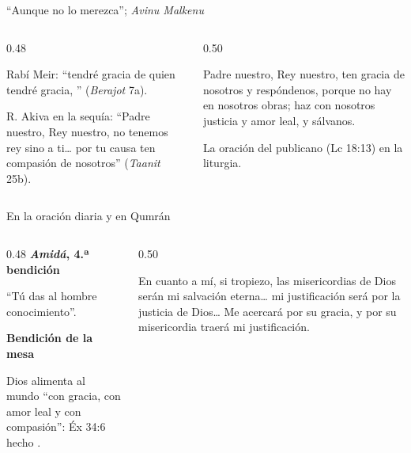 \begin{frame}{``Aunque no lo merezca''; \emph{Avinu Malkenu}}
\begin{columns}[t,onlytextwidth]
\begin{column}{0.48\textwidth}
\centering{}\par{}\par\smallskip
\RaggedRight\small Rabí Meir: ``tendré gracia de quien tendré gracia, '' (\emph{Berajot} 7a).\par\medskip
\scriptsize R. Akiva en la sequía: ``Padre nuestro, Rey nuestro, no tenemos rey sino a ti\ldots{} por tu causa ten compasión de nosotros'' (\emph{Taanit} 25b).
\end{column}
\begin{column}{0.50\textwidth}
\centering{}\par{}
\begin{cita}Padre nuestro, Rey nuestro, ten gracia de nosotros y respóndenos, porque no hay en nosotros obras; haz con nosotros justicia y amor leal, y sálvanos.\end{cita}
\scriptsize La oración del publicano (Lc 18:13) en la liturgia.\par
{}
\end{column}
\end{columns}
\end{frame}

\begin{frame}{En la oración diaria y en Qumrán}
\begin{columns}[t,onlytextwidth]
\begin{column}{0.48\textwidth}\small\RaggedRight
\textbf{\textcolor{azul}{\emph{Amidá}, 4.ª bendición}}\par
\centering{}\par\RaggedRight
``Tú das  al hombre conocimiento''.\par\medskip
\textbf{\textcolor{azul}{Bendición de la mesa}}\par
\centering{}\par\RaggedRight
Dios alimenta al mundo ``con gracia, con amor leal y con compasión'': Éx 34:6 hecho .
\end{column}
\begin{column}{0.50\textwidth}
\begin{cita}En cuanto a mí, si tropiezo, las misericordias de Dios serán mi salvación eterna\ldots{} mi justificación será por la justicia de Dios\ldots{} Me acercará por su gracia, y por su misericordia traerá mi justificación.\end{cita}
\end{column}
\end{columns}
\end{frame}

